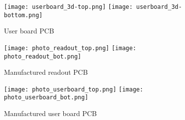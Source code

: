 \FloatBarrier
\begin{figure}[htp!]
    \centering
    \texttt{[image: userboard\_3d-top.png]}
    \hspace{1.8cm}
    \texttt{[image: userboard\_3d-bottom.png]}
    \caption{User board PCB}
    \label{fig:userboard_3d}
\end{figure}
\FloatBarrier


\FloatBarrier
\begin{figure}[htp!]
    \centering
    \texttt{[image: photo\_readout\_top.png]}
    \texttt{[image: photo\_readout\_bot.png]}
    \caption{Manufactured readout PCB}
    \label{fig:photos_readout}
\end{figure}
\FloatBarrier

\FloatBarrier
\begin{figure}[htp!]
    \centering
    \texttt{[image: photo\_userboard\_top.png]}
    \hspace{1cm}
    \texttt{[image: photo\_userboard\_bot.png]}
    \caption{Manufactured user board PCB}
    \label{fig:photos_userboard}
\end{figure}
\FloatBarrier
